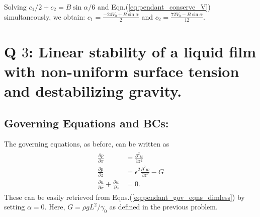 \documentclass{article}
\begin{document}
Solving 
$c_{1}/2 + c_{2} = B\sin{\alpha}/6$ and Eqn.(\ref{eq:pendant_conserve_V}) simultaneously, we obtain: $c_{1} =  \frac{-24V_{0} + B\sin{\alpha}}{2}$ and $c_{2} = \frac{72 V_{0} - B\sin{\alpha}}{12}$.  

\section{Q $3$: Linear stability of a liquid film with non-uniform surface tension and destabilizing gravity. }
\subsection*{Governing Equations and BCs:}
The governing equations, as before, can be written as 
\begin{align}\label{eq:marangoni_gov_eqns_dimless}
 \begin{split}
 \frac{\partial p}{\partial x} &= \frac{\partial^{2} u}{\partial z^{2}}  \\
  \frac{\partial p}{\partial z} &= \epsilon^{2} \frac{\partial^{2} w}{\partial z^{2}} - G  \\
  \frac{\partial u}{\partial x} + \frac{\partial w}{\partial z} &= 0.
 \end{split}
\end{align}
These can be easily retrieved from Eqns.(\ref{eq:pendant_gov_eqns_dimless}) by setting $\alpha = 0$. Here, $G = \rho g L^{2}/\gamma_{0}$ as defined in the previous problem. 
\end{document}
